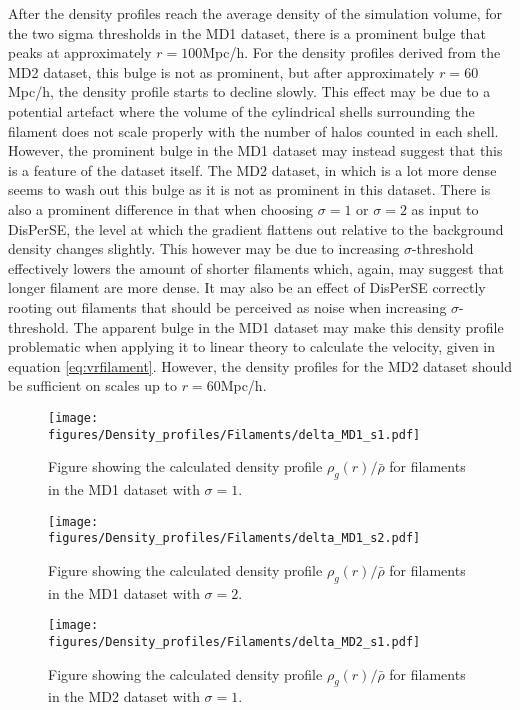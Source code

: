 After the density profiles reach the average density of the simulation volume, for the two sigma thresholds in the MD1 dataset, there is a prominent bulge that peaks at approximately $r=100$Mpc/h. For the density profiles derived from the MD2 dataset, this bulge is not as prominent, but after approximately $r=60$Mpc/h, the density profile starts to decline slowly. This effect may be due to a potential artefact where the volume of the cylindrical shells surrounding the filament does not scale properly with the number of halos counted in each shell. However, the prominent bulge in the MD1 dataset may instead suggest that this is a feature of the dataset itself. The MD2 dataset, in which is a lot more dense seems to wash out this bulge as it is not as prominent in this dataset. There is also a prominent difference in that when choosing $\sigma=1$ or $\sigma=2$ as input to DisPerSE, the level at which the gradient flattens out relative to the background density changes slightly. This however may be due to increasing $\sigma$-threshold effectively lowers the amount of shorter filaments which, again, may suggest that longer filament are more dense. It may also be an effect of DisPerSE correctly rooting out filaments that should be perceived as noise when increasing $\sigma$-threshold. The apparent bulge in the MD1 dataset may make this density profile problematic when applying it to linear theory to calculate the velocity, given in equation \ref{eq:vrfilament}. However, the density profiles for the MD2 dataset should be sufficient on scales up to $r=60$Mpc/h.
\begin{figure}[H]
    \texttt{[image: figures/Density\_profiles/Filaments/delta\_MD1\_s1.pdf]}
    \caption{Figure showing the calculated density profile $\rho_g(r)/\bar{\rho}$ for filaments in the MD1 dataset with $\sigma=1$.}
    \label{fig:fildensitytMD1s1}
\end{figure}

\begin{figure}[H]
    \texttt{[image: figures/Density\_profiles/Filaments/delta\_MD1\_s2.pdf]}
    \caption{Figure showing the calculated density profile $\rho_g(r)/\bar{\rho}$ for filaments in the MD1 dataset with $\sigma=2$.}
    \label{fig:fildensitytMD1s2}
\end{figure}

\begin{figure}[H]
    \texttt{[image: figures/Density\_profiles/Filaments/delta\_MD2\_s1.pdf]}
    \caption{Figure showing the calculated density profile $\rho_g(r)/\bar{\rho}$ for filaments in the MD2 dataset with $\sigma=1$.}
    \label{fig:fildensitytMD2s1}
\end{figure}


